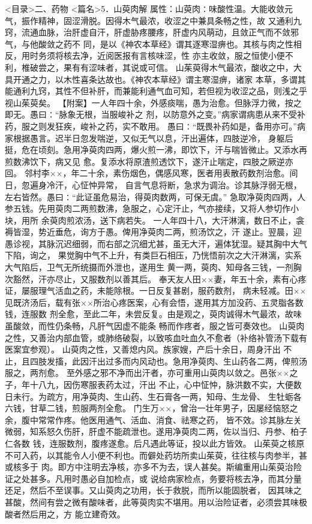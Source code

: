 \documentclass[a4paper,12pt,UTF8,twoside]{ctexbook}
\begin{document}
<目录>二、药物
<篇名>5．山萸肉解
属性：山萸肉∶味酸性温。大能收敛元气，振作精神，固涩滑脱。因得木气最浓，收涩之中兼具条畅之性，故 
又通利九窍，流通血脉，治肝虚自汗，肝虚胁疼腰疼，肝虚内风萌动，且敛正气而不敛邪气，与他酸敛之药不 
同，是以《神农本草经》谓其逐寒湿痹也。其核与肉之性相反，用时务须将核去净，近阅医报有言核味涩，性 
亦主收敛，服之恒使小便不利，椎破尝之，果有有涩味者，其说或可信。 
山茱萸得木气最浓，酸收之中，大具开通之力，以木性喜条达故也。《神农本草经》谓主寒湿痹，诸家 
本草，多谓其能通利九窍，其性不但补肝，而兼能利通气血可知，若但视为收涩之品，则浅之乎视山茱萸矣。 
【附案】一人年四十余，外感痰喘，愚为治愈。但脉浮力微，按之即无。愚曰∶“脉象无根，当服峻补之 
剂，以防意外之变。”病家谓病患从来不受补药，服之则发狂疾，峻补之药，实不敢用。 
愚曰∶“既畏补药如是，备用亦可。”病家根据愚言。迟半日忽发喘逆，又似无气以息，汗出遍体，四肢逆冷， 
身躯后挺，危在顷刻。急用净萸肉四两，爆火煎一沸，即饮下，汗与喘皆微止。又添水再煎数沸饮下，病又见 
愈。复添水将原渣煎透饮下，遂汗止喘定，四肢之厥逆亦回。 
邻村李××，年二十余，素伤烟色，偶感风寒，医者用表散药数剂治愈。间日，忽遍身冷汗，心怔忡异常， 
自言气息将断，急求为调治。诊其脉浮弱无根，左右皆然。愚曰∶“此证虽危易治，得萸肉数两，可保无虞。” 
急取净萸肉四两，人参五钱。先用萸肉二两煎数沸，急服之，心定汗止，气亦接续，又将人参切作小块，用所 
余萸肉煎浓汤，送下病若失。 
一人年四十八，大汗淋漓，数日不止，衾褥皆湿，势近垂危，询方于愚。俾用净萸肉二两，煎汤饮之，汗 
遂止。翌晨，迎愚诊视，其脉沉迟细弱，而右部之沉细尤甚，虽无大汗，遍体犹湿。疑其胸中大气下陷，询之， 
果觉胸中气不上升，有类巨石相压，乃恍悟前次之大汗淋漓，实系大气陷后，卫气无所统摄而外泄也，遂用生 
黄一两，萸肉、知母各三钱，一剂胸次豁然，汗亦尽止，又服数剂以善其后。 
奉天友人田××妻，年五十余，素有心疼证，屡服理气活血之药，未能除根。一日反复甚剧，服药数剂， 
病未轻减。田××见既济汤后，载有张××所治心疼医案，心有会悟，遂用其方加没药、五灵脂各数钱，连服数 
剂全愈，至此二年，未尝反复。由是观之，萸肉诚得木气最浓，故味虽酸敛，而性仍条畅，凡肝气因虚不能条 
畅而作疼者，服之皆可奏效也。 
山萸肉之性，又善治内部血管，或肺络破裂，以致咳血吐血久不愈者（补络补管汤下载有医案宜参观）。 
山萸肉之性，又善熄内风。族家嫂，产后十余日，周身汗出 
不止，且四肢发搐，此因汗出过多而内风动也。急用净萸肉、生山药各二两，俾煎汤服之，两剂愈。 
至外感之邪不净而出汗者，亦可重用山萸肉以敛之。邑张××之子，年十八九，因伤寒服表药太过，汗出 
不止，心中怔忡，脉洪数不实，大便数日未行。为疏方，用净萸肉、生山药、生石膏各一两，知母、生龙骨、 
生牡蛎各六钱，甘草二钱，煎服两剂全愈。 
门生万××，曾治一壮年男子，因屡经恼怒之余，腹中常常作疼。他医用通气、活血、消食、祛寒之药， 
皆不效。诊其脉左关微弱，知系怒久伤肝，肝虚不能疏泄也。遂用净萸肉二两，佐以当归、丹参、柏子仁各数 
钱，连服数剂，腹疼遂愈。后凡遇此等证，投以此方皆效。 
山茱萸之核原不可入药，以其能令人小便不利也。而僻处药坊所卖山茱萸，往往核与肉参半，甚或核多于 
肉。即方中注明去净核，亦多不为去，误人甚矣。斯编重用山茱萸治险证之处甚多。凡用时愚必自加检点，或 
说给病家检点，务要将核去净，而其分量还足，然后不至误事。又山萸肉之功用，长于救脱，而所以能固脱者， 
因其味之甚酸，然间有尝之微有酸味者，此等萸肉实不堪用。用以治险证者，必须尝其味极酸者然后用之，方 
能立建奇效。 
\end{document}
